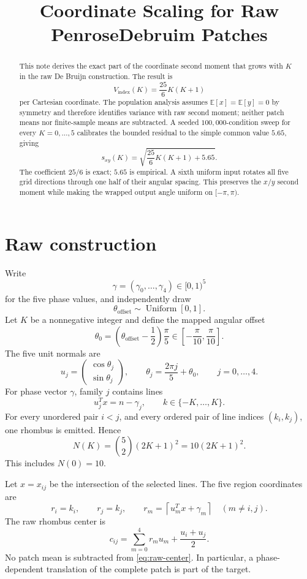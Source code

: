 \documentclass[11pt]{article}
\title{Coordinate Scaling for Raw PenroseDebruim Patches}
\author{}
\date{}
\newcommand{\E}{\mathbb{E}}
\begin{document}
\maketitle

\begin{abstract}
This note derives the exact part of the coordinate second moment that grows
with \(K\) in the raw De Bruijn construction.  The result is
\[
  V_{\mathrm{index}}(K)
  =\frac{25}{6}K(K+1)
\]
per Cartesian coordinate.  The population analysis assumes
\(\E[x]=\E[y]=0\) by symmetry and therefore identifies variance with raw
second moment; neither patch means nor finite-sample means are subtracted.
A seeded \(100{,}000\)-condition sweep for every \(K=0,\ldots,5\) calibrates
the bounded residual to the simple common value \(5.65\), giving
\[
  s_{xy}(K)
  =
  \sqrt{\frac{25}{6}K(K+1)+5.65}.
\]
The coefficient \(25/6\) is exact; \(5.65\) is empirical.  A sixth uniform
input rotates all five grid directions through one half of their angular
spacing.  This preserves the \(x/y\) second moment while making the wrapped
output angle uniform on \([-\pi,\pi)\).
\end{abstract}

\section{Raw construction}

Write
\[
  \gamma=(\gamma_0,\ldots,\gamma_4)\in[0,1)^5
\]
for the five phase values, and independently draw
\[
  \theta_{\mathrm{offset}}\sim\operatorname{Uniform}[0,1].
\]
Let \(K\) be a nonnegative integer and define the mapped angular offset
\[
  \theta_0
  =\left(\theta_{\mathrm{offset}}-\frac12\right)\frac{\pi}{5}
  \in\left[-\frac{\pi}{10},\frac{\pi}{10}\right].
\]
The five unit normals are
\[
  u_j =
  \begin{pmatrix}\cos\theta_j\\\sin\theta_j\end{pmatrix},
  \qquad
  \theta_j=\frac{2\pi j}{5}+\theta_0,
  \qquad j=0,\ldots,4.
\]
For phase vector \(\gamma\), family \(j\) contains lines
\[
  u_j^T x=n-\gamma_j,
  \qquad k\in\{-K,\ldots,K\}.
\]
For every unordered pair \(i<j\), and every ordered pair of line indices
\((k_i,k_j)\), one rhombus is emitted.  Hence
\[
  N(K)=\binom52(2K+1)^2
  =10(2K+1)^2.
\]
This includes \(N(0)=10\).

Let \(x=x_{ij}\) be the intersection of the selected lines.  The five region
coordinates are
\[
  r_i=k_i,\qquad r_j=k_j,\qquad
  r_m=\left\lceil u_m^T x+\gamma_m\right\rceil
  \quad(m\ne i,j).
\]
The raw rhombus center is
\begin{equation}
  c_{ij}
  =
  \sum_{m=0}^4 r_m u_m
  +\frac{u_i+u_j}{2}.
  \label{eq:raw-center}
\end{equation}
No patch mean is subtracted from \eqref{eq:raw-center}.  In particular, a
phase-dependent translation of the complete patch is part of the target.
\end{document}
